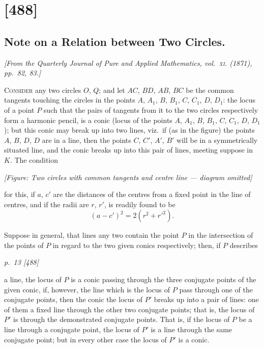 \documentclass[11pt,a4paper]{book}
\begin{document}
\clearpage

\section{[488]}
\subsection{Note on a Relation between Two Circles.}

\begin{center}
\textit{[From the Quarterly Journal of Pure and Applied Mathematics, vol.~\textsc{xi}. (1871), pp.~82, 83.]}
\end{center}

\textsc{Consider} any two circles $O$, $Q$; and let $AC$, $BD$, $AB$, $BC$ be the common
tangents touching the circles in the points $A$, $A_1$, $B$, $B_1$, $C$, $C_1$, $D$, $D_1$: the locus of
a point $P$ such that the pairs of tangents from it to the two circles respectively form
a harmonic pencil, is a conic (locus of the points $A$, $A_1$, $B$, $B_1$, $C$, $C_1$, $D$, $D_1$); but this conic may break up into two lines, viz.\ if (as in the figure) the points $A$, $B$, $D$, $D$
are in a line, then the points $C$, $C'$, $A'$, $B'$ will be in a symmetrically situated line,
and the conic breaks up into this pair of lines, meeting suppose in $K$.  The condition

\begin{center}
\textit{[Figure: Two circles with common tangents and centre line --- diagram omitted]}
\end{center}

for this, if $a$, $c'$ are the distances of the centres from a fixed point in the line of
centres, and if the radii are $r$, $r'$, is readily found to be
\[
(a - c')^2 = 2 (r^2 + r'^2).
\]

Suppose in general, that lines any two contain the point $P$ in the intersection
of the points of $P$ in regard to the two given conics respectively; then, if $P$ describes

\clearpage

\bigskip
\textit{p.~13 [488]}
\smallskip

\noindent
a line, the locus of $P$ is a conic passing through the three conjugate points of the
given conic, if, however, the line which is the locus of $P$ pass through one of the
conjugate points, then the conic the locus of $P'$ breaks up into a pair of lines: one of
them a fixed line through the other two conjugate points; that is, the locus of $P'$ is
through the demonstrated conjugate points.  That is, if the locus of $P$ be a line
through a conjugate point, the locus of $P'$ is a line through the same conjugate
point; but in every other case the locus of $P'$ is a conic.
\end{document}
